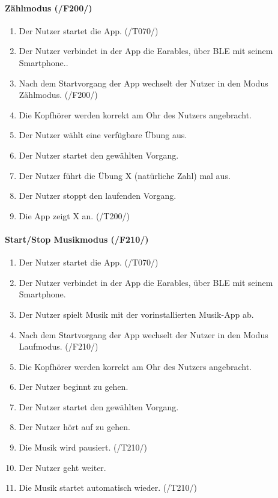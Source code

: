 \documentclass[a4paper,12pt]{article}
\begin{document}
    \paragraph{Zählmodus (/F200/)}
      \begin{enumerate}
        \item Der Nutzer startet die App. (/T070/)
        \item Der Nutzer verbindet in der App die \gls{Earables}, über \gls{BLE} mit seinem Smartphone..
        \item Nach dem Startvorgang der App wechselt der Nutzer in den Modus \glqq Zählmodus\grqq . (/F200/)
        \item Die Kopfhörer werden korrekt am Ohr des Nutzers angebracht.
        \item Der Nutzer wählt eine verfügbare Übung aus. 
        \item Der Nutzer startet den gewählten \Gls{Vorgang}.
        \item Der Nutzer führt die Übung X (natürliche Zahl) mal aus.
        \item Der Nutzer stoppt den laufenden \Gls{Vorgang}.
        \item Die App zeigt X an. (/T200/)
      \end{enumerate}

    
    \paragraph{Start/Stop Musikmodus (/F210/)}
      \begin{enumerate}
        \item Der Nutzer startet die App. (/T070/)
        \item Der Nutzer verbindet in der App die \gls{Earables}, über \gls{BLE} mit seinem Smartphone.
        \item Der Nutzer spielt Musik mit der vorinstallierten Musik-App ab.
        \item Nach dem Startvorgang der App wechselt der Nutzer in den Modus \glqq Laufmodus\grqq . (/F210/)
        \item Die Kopfhörer werden korrekt am Ohr des Nutzers angebracht.
        \item Der Nutzer beginnt zu gehen.
        \item Der Nutzer startet den gewählten \Gls{Vorgang}.
        \item Der Nutzer hört auf zu gehen.
        \item Die Musik wird pausiert. (/T210/)
        \item Der Nutzer geht weiter.
        \item Die Musik startet automatisch wieder. (/T210/)
      \end{enumerate}
  
\end{document}
